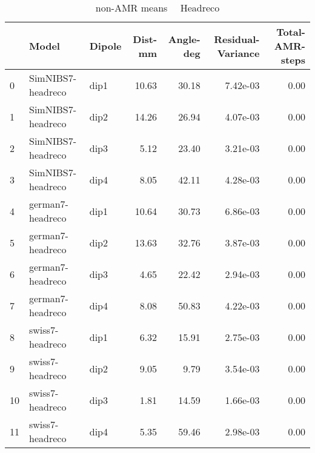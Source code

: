 \documentclass{article}
\begin{document}
\begin{table}
\begin{tabular}{lllrrrr}
\toprule
& Model& Dipole& Dist-mm& Angle-deg& Residual-Variance& Total-AMR-steps\\
\midrule
\rowcolor{lightgray}0 & SimNIBS7-headreco & dip1 & 10.63 & 30.18 & 7.42e-03 & 0.00\\
\rowcolor{lightgray}1 & SimNIBS7-headreco & dip2 & 14.26 & 26.94 & 4.07e-03 & 0.00\\
\rowcolor{lightgray}2 & SimNIBS7-headreco & dip3 & 5.12 & 23.40 & 3.21e-03 & 0.00\\
\rowcolor{lightgray}3 & SimNIBS7-headreco & dip4 & 8.05 & 42.11 & 4.28e-03 & 0.00\\
\rowcolor{yellow}4 & german7-headreco & dip1 & 10.64 & 30.73 & 6.86e-03 & 0.00\\
\rowcolor{yellow}5 & german7-headreco & dip2 & 13.63 & 32.76 & 3.87e-03 & 0.00\\
\rowcolor{yellow}6 & german7-headreco & dip3 & 4.65 & 22.42 & 2.94e-03 & 0.00\\
\rowcolor{yellow}7 & german7-headreco & dip4 & 8.08 & 50.83 & 4.22e-03 & 0.00\\
\rowcolor{pink}8 & swiss7-headreco & dip1 & 6.32 & 15.91 & 2.75e-03 & 0.00\\
\rowcolor{pink}9 & swiss7-headreco & dip2 & 9.05 & 9.79 & 3.54e-03 & 0.00\\
\rowcolor{pink}10 & swiss7-headreco & dip3 & 1.81 & 14.59 & 1.66e-03 & 0.00\\
\rowcolor{pink}11 & swiss7-headreco & dip4 & 5.35 & 59.46 & 2.98e-03 & 0.00\\
\end{tabular}
\caption{non-AMR means \ \textemdash \ Headreco}
\end{table}
\end{document}
